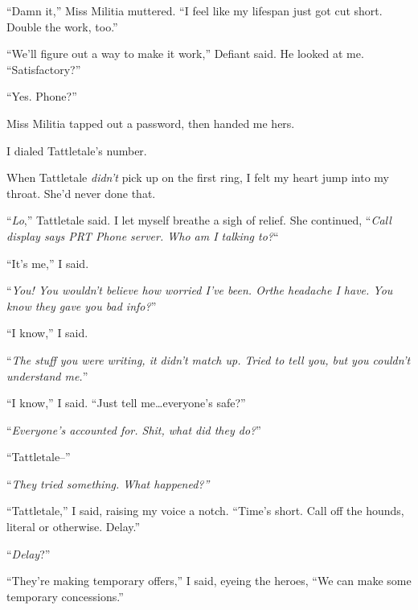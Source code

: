 ``Damn it,'' Miss Militia muttered.  ``I feel like my lifespan just got cut short.  Double the work, too.''



``We'll figure out a way to make it work,'' Defiant said.  He looked at me.  ``Satisfactory?''



``Yes.  Phone?''



Miss Militia tapped out a password, then handed me hers.



I dialed Tattletale's number.



When Tattletale \emph{didn't} pick up on the first ring, I felt my heart jump into my throat.  She'd never done that.



``\emph{Lo},'' Tattletale said.  I let myself breathe a sigh of relief.  She continued, ``\emph{Call display says PRT Phone server.  Who am I talking to?}``



``It's me,'' I said.



``\emph{You!  You wouldn't believe how worried I've been.  Or}\emph{the headache I have.  You know they gave you bad info?}''



``I know,'' I said.



``\emph{The stuff you were writing, it didn't match up.  Tried to tell you, but you couldn't understand me.}''



``I know,'' I said.  ``Just tell me\ldots everyone's safe?''



``\emph{Everyone's accounted for.  Shit, what did they do?}''



``Tattletale--''



``\emph{They tried something.  What happened?''}



``Tattletale,'' I said, raising my voice a notch.  ``Time's short.  Call off the hounds, literal or otherwise.  Delay.''



``\emph{Delay}?''



``They're making temporary offers,'' I said, eyeing the heroes, ``We can make some temporary concessions.''



